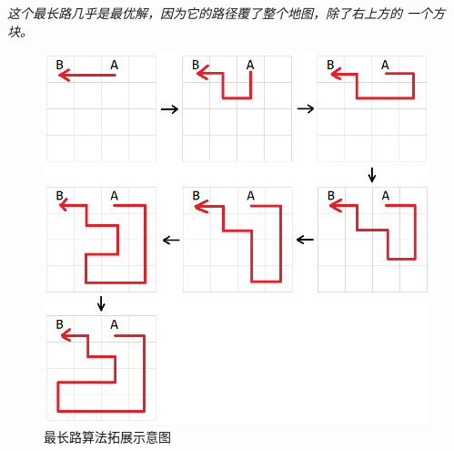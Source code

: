 \documentclass[a4paper]{article}
\begin{document}
\emph{这个最长路几乎是最优解，因为它的路径覆了整个地图，除了右上方的
一个方块。}
\begin{figure}[!hbt]
    \begin{center}
    \includegraphics[scale=0.4]{assets/build-longest.png}
    \caption{最长路算法拓展示意图\label{fig:build-longest}} 
    \end{center} 
\end{figure} 
\end{document}
